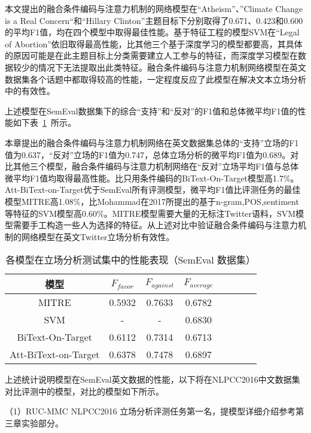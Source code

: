 本文提出的融合条件编码与注意力机制的网络模型在“Atheism”、”Climate Change is a Real Concern“和“Hillary Clinton”主题目标下分别取得了0.671、0.423和0.600的平均F1值，均在四个模型中取得最佳性能。基于特征工程的模型SVM在“Legal of Abortion”依旧取得最高性能，比其他三个基于深度学习的模型都要高，其具体的原因可能是在此主题目标上分类需要建立人工参与的特征，而深度学习模型在数据较少的情况下无法提取出此类特征。融合条件编码与注意力机制网络模型在英文数据集各个话题中都取得较高的性能，一定程度反应了此模型在解决文本立场分析中的有效性。

上述模型在SemEval数据集下的综合“支持”和“反对”的F1值和总体微平均F1值的性能如下表~\ref{semeval_attention_res}~所示。


本章提出的融合条件编码与注意力机制网络在英文数据集总体的“支持”立场的F1值为0.637，“反对”立场的F1值为0.747，总体立场分析的微平均F1值为0.689。对比其他三个模型，融合条件编码与注意力机制网络在“反对”立场平均F1值与总体微平均F1值均取得最高性能。比只用条件编码的BiText-On-Target模型高1.7\%。Att-BiText-on-Target优于SemEval所有评测模型，微平均F1值比评测任务的最佳模型MITRE高1.08\%，比Mohammad在2017所提出的基于n-gram,POS,sentiment等特征的SVM模型高0.60\%。MITRE模型需要大量的无标注Twitter语料，SVM模型需要手工构造一些人为选择的特征。从上述对比中验证融合条件编码与注意力机制的网络模型在英文Twitter立场分析有效性。

\begin{table}[htbp]
	\caption[table123]{各模型在立场分析测试集中的性能表现（SemEval 数据集）}
	\vspace{0.5em}\centering\wuhao
	\label{semeval_attention_res}
	\begin{tabular}{cccccccc}
		\toprule[1.5pt]
		模型& $F_{favor}$&$F_{against}$&$F_{average}$ \\
		\midrule[1pt]
		MITRE\citeup{zarrella2016mitre}&0.5932&0.7633&0.6782\\
		SVM\citeup{mohammadstance} &-&-&0.6830\\
		BiText-On-Target&0.6112&0.7314&0.6713\\
			Att-BiText-on-Target&0.6378&0.7478&0.6897\\
		\bottomrule[1.5pt]
	\end{tabular}
\end{table}

上述统计说明模型在SemEval英文数据的性能，以下将在NLPCC2016中文数据集对比评测中的模型，对比的模型如下所示。

（1）RUC-MMC NLPCC2016 立场分析评测任务第一名，提模型详细介绍参考第三章实验部分。


